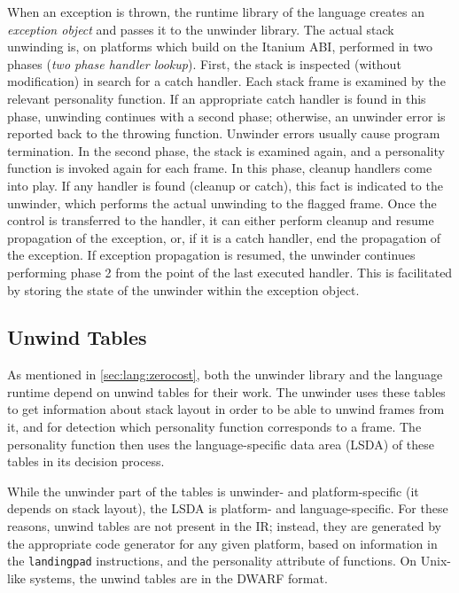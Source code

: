 When an exception is thrown, the runtime library of the language creates
an \emph{exception object} and passes it to the unwinder library. The
actual stack unwinding is, on platforms which build on the Itanium ABI,
performed in two phases (\emph{two phase handler lookup}).
First, the stack is inspected (without
modification) in search for a catch handler. Each stack frame is
examined by the relevant personality function. If an appropriate catch handler is found in this
phase, unwinding continues with a second phase; otherwise, an unwinder
error is reported back to the throwing function. Unwinder errors usually
cause program termination. In the second phase, the stack is examined
again, and a personality function is invoked again for each frame. In
this phase, cleanup handlers come into play. If any handler is found
(cleanup or catch), this fact is indicated to the unwinder, which
performs the actual unwinding to the flagged frame. Once the control is
transferred to the handler, it can either perform cleanup and resume
propagation of the exception, or, if it is a catch handler, end the
propagation of the exception. If exception propagation is resumed, the
unwinder continues performing phase 2 from the point of the last
executed handler. This is facilitated by storing the state of the
unwinder within the exception object.

\subsection{Unwind Tables}\label{sec:lang:unwind-tables}

As mentioned in \autoref{sec:lang:zerocost}, both the unwinder library
and the language runtime depend on unwind tables for their work. The
unwinder uses these tables to get information about stack layout in
order to be able to unwind frames from it, and for detection which
personality function corresponds to a frame. The personality function
then uses the language-specific data area (LSDA) of these tables in its
decision process.

While the unwinder part of the tables is unwinder- and platform-specific
(it depends on stack layout), the LSDA is platform- and
language-specific. For these reasons, unwind tables are not present in
the \llvm{} IR; instead, they are generated by the appropriate code
generator for any given platform, based on information in the
\texttt{landingpad} instructions, and the personality attribute of
functions. On Unix-like systems, the unwind tables are in the
DWARF format.

